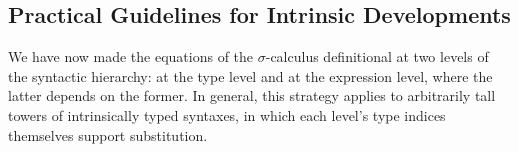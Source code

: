 \documentclass[manuscript,screen,review,anonymous,acmsmall]{acmart}
\begin{document}
%
%

\subsection{Practical Guidelines for  Intrinsic Developments}
\label{sec:tower}

We have now made the equations of the $\sigma$-calculus definitional
at two levels of the syntactic hierarchy: at the type level and at
the expression level, where the latter depends on the former.
In general, this strategy applies to
arbitrarily tall towers of intrinsically typed syntaxes, in
which each level's type indices themselves support substitution.
\end{document}
